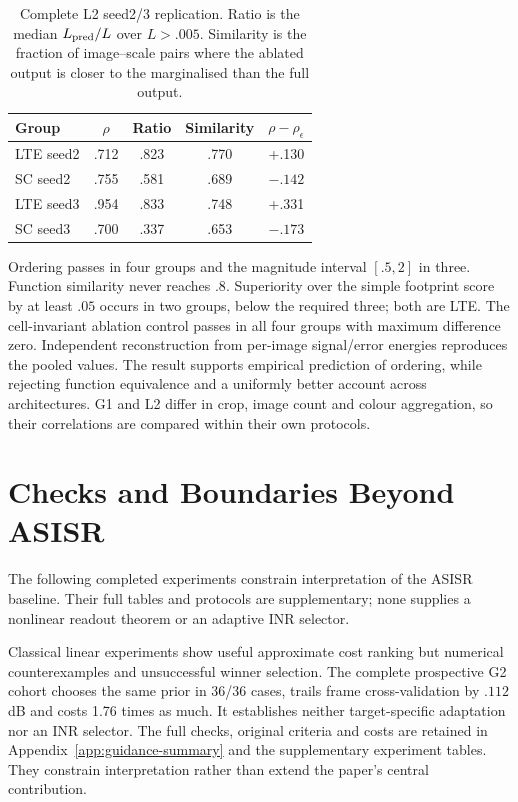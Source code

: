 \begin{table}[t]\centering\small
\caption{Complete L2 seed2/3 replication. Ratio is the median $L_{\rm pred}/L$ over $L>.005$. Similarity is the fraction of image--scale pairs where the ablated output is closer to the marginalised than the full output.}\label{tab:l2-main}
\begin{tabular}{lcccc}\toprule
Group & $\rho$ & Ratio & Similarity & $\rho-\rho_\epsilon$\\\midrule
LTE seed2 & .712 & .823 & .770 & +.130\\
SC seed2 & .755 & .581 & .689 & $-.142$\\
LTE seed3 & .954 & .833 & .748 & +.331\\
SC seed3 & .700 & .337 & .653 & $-.173$\\\bottomrule
\end{tabular}
\end{table}
Ordering passes in four groups and the magnitude interval $[.5,2]$ in three. Function similarity never reaches $.8$. Superiority over the simple footprint score by at least $.05$ occurs in two groups, below the required three; both are LTE. The cell-invariant ablation control passes in all four groups with maximum difference zero. Independent reconstruction from per-image signal/error energies reproduces the pooled values. The result supports empirical prediction of ordering, while rejecting function equivalence and a uniformly better account across architectures. G1 and L2 differ in crop, image count and colour aggregation, so their correlations are compared within their own protocols.

\section{Checks and Boundaries Beyond ASISR}\label{sec:boundary}
The following completed experiments constrain interpretation of the ASISR baseline. Their full tables and protocols are supplementary; none supplies a nonlinear readout theorem or an adaptive INR selector.

Classical linear experiments show useful approximate cost ranking but numerical counterexamples and unsuccessful winner selection. The complete prospective G2 cohort chooses the same prior in 36/36 cases, trails frame cross-validation by $.112$ dB and costs 1.76 times as much. It establishes neither target-specific adaptation nor an INR selector. The full checks, original criteria and costs are retained in Appendix~\ref{app:guidance-summary} and the supplementary experiment tables. They constrain interpretation rather than extend the paper's central contribution.

